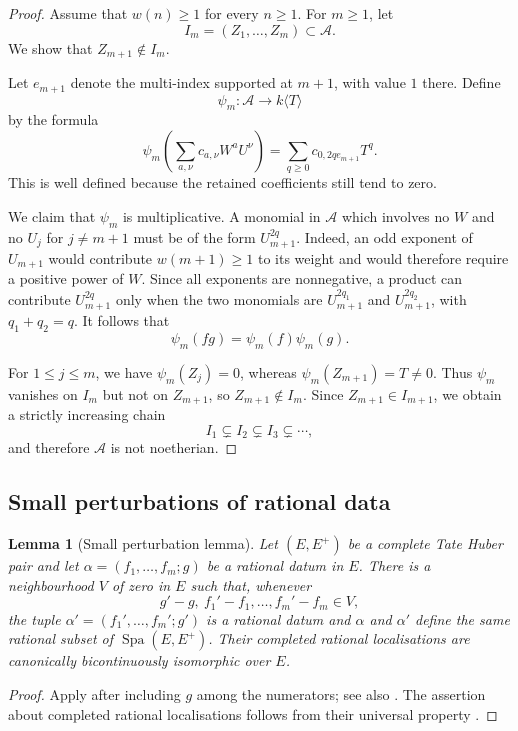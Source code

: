 \documentclass[11pt,reqno]{amsart}
\newtheorem{lemma}[lemma]{Lemma}
\theoremstyle{definition}
\newcommand{\Spa}{\operatorname{Spa}}
\begin{document}
\begin{proof}
Assume that $w(n)\geq1$ for every $n\geq1$.  For $m\geq1$, let
\[
  I_m=(Z_1,\ldots,Z_m)\subset\mathcal A.
\]
We show that $Z_{m+1}\notin I_m$.

Let $e_{m+1}$ denote the multi-index supported at $m+1$, with value $1$
there.  Define
\[
  \psi_m:\mathcal A\longrightarrow k\langle T\rangle
\]
by the formula
\[
  \psi_m\left(\sum_{a,\nu}c_{a,\nu}W^aU^\nu\right)
  =\sum_{q\geq0}c_{0,2q e_{m+1}}T^q.
\]
This is well defined because the retained coefficients still tend to zero.

We claim that $\psi_m$ is multiplicative.  A monomial in $\mathcal A$ which
involves no $W$ and no $U_j$ for $j\neq m+1$ must be of the form
$U_{m+1}^{2q}$.  Indeed, an odd exponent of $U_{m+1}$ would contribute
$w(m+1)\geq1$ to its weight and would therefore require a positive power of
$W$.  Since all exponents are nonnegative, a product can contribute
$U_{m+1}^{2q}$ only when the two monomials are $U_{m+1}^{2q_1}$ and
$U_{m+1}^{2q_2}$, with $q_1+q_2=q$.
It follows that
\[
  \psi_m(fg)=\psi_m(f)\psi_m(g).
\]

For $1\leq j\leq m$, we have $\psi_m(Z_j)=0$, whereas
$\psi_m(Z_{m+1})=T\neq0$.  Thus $\psi_m$ vanishes on $I_m$ but not on
$Z_{m+1}$, so $Z_{m+1}\notin I_m$.  Since $Z_{m+1}\in I_{m+1}$, we obtain a
strictly increasing chain
\[
  I_1\subsetneq I_2\subsetneq I_3\subsetneq\cdots,
\]
and therefore $\mathcal A$ is not noetherian.
\end{proof}

\subsection{Small perturbations of rational data}

\begin{lemma}[Small perturbation lemma]\label{lem:small-perturbation}
Let $(E,E^+)$ be a complete Tate Huber pair and let
$\alpha=(f_1,\ldots,f_m;g)$ be a rational datum in $E$.  There is a
neighbourhood $V$ of zero in $E$ such that, whenever
\[
  g'-g,\ f_1'-f_1,\ldots,f_m'-f_m\in V,
\]
the tuple $\alpha'=(f_1',\ldots,f_m';g')$ is a rational datum and
$\alpha$ and $\alpha'$ define the same rational subset of
$\Spa(E,E^+)$.  Their completed rational localisations are canonically
bicontinuously isomorphic over $E$.
\end{lemma}

\begin{proof}
Apply \cite[Lemma~3.10]{Huber93} after including $g$ among the
numerators; see also \cite[Remark~2.4.7]{KL}.
The assertion about completed rational localisations follows from their
universal property \cite[Proposition~1.3]{Huber94}.
\end{proof}
\end{document}
